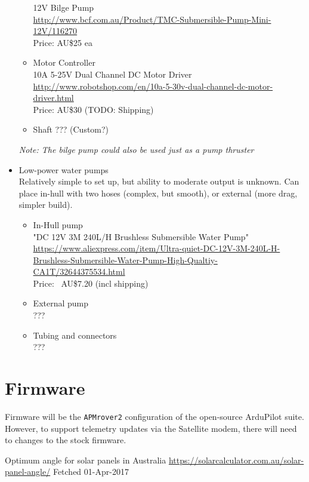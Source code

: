 \begin{itemize}
\begin{itemize}
  12V Bilge Pump \\
  \url{http://www.bcf.com.au/Product/TMC-Submersible-Pump-Mini-12V/116270} \\
  Price: AU\$25 ea
 \item{Motor Controller} \\
  10A 5-25V Dual Channel DC Motor Driver \\
  \url{http://www.robotshop.com/en/10a-5-30v-dual-channel-dc-motor-driver.html}\\
  Price: AU\$30 (TODO: Shipping)
 \item{Shaft} ??? (Custom?)
 \end{itemize}
 \emph{Note: The bilge pump could also be used just as a pump thruster}
\item{Low-power water pumps} \\
 Relatively simple to set up, but ability to moderate output is unknown. Can place in-hull with two hoses (complex, but smooth), or external (more drag, simpler build).
 \begin{itemize}
 \item{In-Hull pump} \\
  "DC 12V 3M 240L/H Brushless Submersible Water Pump"
  \url{https://www.aliexpress.com/item/Ultra-quiet-DC-12V-3M-240L-H-Brushless-Submersible-Water-Pump-High-Qualtiy-CA1T/32644375534.html} \\
  Price: ~AU\$7.20 (incl shipping)
 \item{External pump} \\
  ???
 \item{Tubing and connectors} \\
   ???
 \end{itemize}
\end{itemize}

\section{Firmware}
Firmware will be the \texttt{APMrover2} configuration of the open-source ArduPilot suite. However, to support telemetry updates via the Satellite modem, there will need to changes to the stock firmware.

\begin{thebibliography}{9}
 Optimum angle for solar panels in Australia
 \url{https://solarcalculator.com.au/solar-panel-angle/}
 Fetched 01-Apr-2017
\end{thebibliography}


